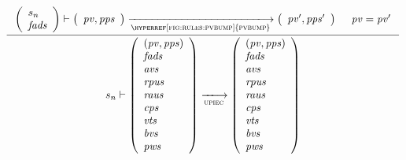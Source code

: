 \begin{figure}[htb]
  \begin{equation}
    \label{eq:rule:upi-ec-pv-unchanged}
    \inference
    {
      {\left(\begin{array}{l}
         s_n\\
         \var{fads}
       \end{array}\right)}
      \vdash
      {
        \left(
          \begin{array}{l}
            \var{pv}, \var{pps}
          \end{array}
        \right)
      }
      \trans{\hyperref[fig:rules:pvbump]{pvbump}}{}
      {
        \left(
          \begin{array}{l}
            \var{pv'}, \var{pps'}\\
          \end{array}
        \right)
      } &\var{pv} = \var{pv'}
    }
    {
      s_n
      \vdash
      {
        \left(
          \begin{array}{l}
            (\var{pv}, \var{pps})\\
            \var{fads}\\
            \var{avs}\\
            \var{rpus}\\
            \var{raus}\\
            \var{cps}\\
            \var{vts}\\
            \var{bvs}\\
            \var{pws}
          \end{array}
        \right)
      }
      \trans{upiec}{}
      {
        \left(
          \begin{array}{l}
            (\var{pv}, \var{pps})\\
            \var{fads}\\
            \var{avs}\\
            \var{rpus}\\
            \var{raus}\\
            \var{cps}\\
            \var{vts}\\
            \var{bvs}\\
            \var{pws}
          \end{array}
        \right)
      }
    }
  \end{equation}
  \nextdef
  \begin{equation}
    \label{eq:rule:upi-ec-pv-change}

\end{equation}
\end{figure}

